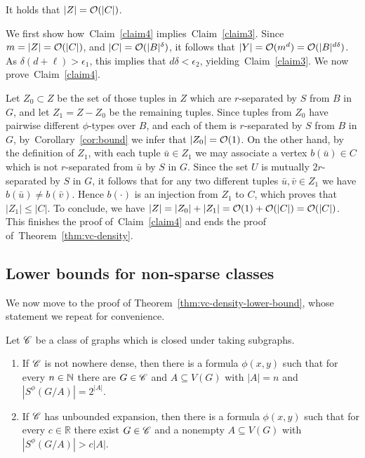   \begin{claim}\label{claim4}
It holds that $|Z|=\mathcal{O}(|C|)$.
  \end{claim}
  
  We first show how~Claim~\ref{claim4} implies~Claim~\ref{claim3}.
  Since $m=|Z|=\mathcal{O}(|C|)$,
  and $|C|=\mathcal{O}(|B|^\delta)$,
  it follows that $|Y|=\mathcal{O}(m^d)=\mathcal{O}(|B|^{d\delta})$. As $\delta(d+\ell)>\epsilon_1$, this implies that $d\delta<\epsilon_2$, yielding~Claim~\ref{claim3}.
  We now prove~Claim~\ref{claim4}.

\medskip
  Let $Z_0\subset Z$ be the set of 
  those tuples in $Z$ which are $r$-separated by $S$ from $B$ in $G$,
  and let $Z_1=Z-Z_0$ be the remaining  tuples.
  Since tuples from $Z_0$ have pairwise different $\phi$-types over $B$, and each of them is $r$-separated by $S$ from $B$ in $G$, by~Corollary~\ref{cor:bound} we infer that $|Z_0|=\mathcal{O}(1)$.  
 On the other hand, by the definition of $Z_1$, with each tuple $\bar u\in Z_1$ we may associate a vertex $b(\bar u)\in C$ which is not $r$-separated from $\bar u$ by $S$ in $G$.
 Since the set $U$ is mutually $2r$-separated by $S$ in $G$, it follows that for any two different tuples $\bar u,\bar v\in Z_1$ we have $b(\bar u)\neq b(\bar v)$.
 Hence $b(\cdot)$ is an injection from $Z_1$ to $C$, which proves that $|Z_1|\leq |C|$.
 To conclude, we have $|Z|=|Z_0|+|Z_1|=\mathcal{O}(1)+\mathcal{O}(|C|)=\mathcal{O}(|C|)$. This finishes the proof of~Claim~\ref{claim4} and ends the proof of~Theorem~\ref{thm:vc-density}.

  
\subsection{Lower bounds for non-sparse classes}
We now move to the proof of Theorem~\ref{thm:vc-density-lower-bound},
whose statement we repeat for convenience.


 \setcounter{aux}{\value{theorem}}
\setcounter{theorem}{\value{vclower}}
 \setcounter{auxsec}{\value{section}}
 \setcounter{section}{1}
 \begin{theorem}
   Let $\mathscr{C}$ be a class of graphs which
   is closed under taking subgraphs.
   \begin{enumerate}
   \item If $\mathscr{C}$ is not nowhere dense, then there is a formula
   $\phi(x,y)$ such that for every $n\in \mathbb{N}$ there are $G\in\mathscr{C}$ and $A\subseteq V(G)$
   with $|A|=n$ and $|S^\phi(G/A)|=2^{|A|}$.
   \item If $\mathscr{C}$ has unbounded expansion, then there is a formula
   $\phi(x,y)$ such that for every $c\in \mathbb{R}$ there exist $G\in\mathscr{C}$ and a nonempty $A\subseteq V(G)$ with $|S^\phi(G/A)|>c|A|$.
   \end{enumerate}
 \end{theorem}
 \setcounter{theorem}{\value{aux}}
 \setcounter{section}{\value{auxsec}}
 
